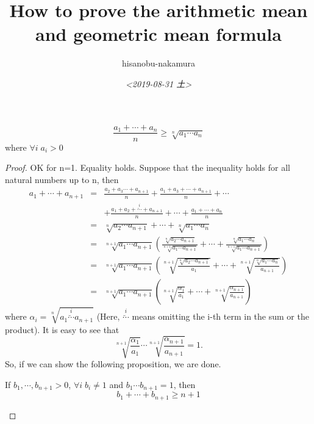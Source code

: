 \documentclass{article}
\author{hisanobu-nakamura}
\date{\textit{<2019-08-31 土>}}
\title{How to prove the arithmetic mean and geometric mean formula}
\begin{document}
\maketitle
\tableofcontents

\begin{equation*}
\label{ }
\frac{a_1 + \cdots + a_n}{n} \ge \sqrt[n]{a_1\cdots a_n}
\end{equation*}
where $\forall i \; a_i > 0$ \\
\begin{proof}
OK for n=1. Equality holds. Suppose that the inequality holds for all natural numbers up to n, then
\begin{eqnarray*}
a_1 + \cdots + a_{n+1} & = & \frac{a_2 + a_3 \cdots + a_{n+1}}{n} + \frac{a_1 + a_3 + \cdots + a_{n+1}}{n} + \cdots  \nonumber \\
 &  &  + \frac{a_1 + a_2 + \overset{i}{\breve{\cdots} } + a_{n+1}}{n} + \cdots + \frac{a_1 + \cdots + a_{n}}{n}\nonumber\\
 & = &  \sqrt[n]{a_2\cdots a_{n+1}} + \cdots + \sqrt[n]{a_1\cdots a_n} \nonumber \\
  & = &  \sqrt[n+1]{a_1\cdots a_{n+1}} \left( \frac{\sqrt[n]{a_2\cdots a_{n+1}}}{\sqrt[n+1]{a_1\cdots a_{n+1}}} + \cdots + \frac{\sqrt[n]{a_1\cdots a_n}}{\sqrt[n+1]{a_1\cdots a_{n+1}}} \right) \nonumber \\
   & = &  \sqrt[n+1]{a_1\cdots a_{n+1}} \left( \sqrt[n+1]{\frac{\sqrt[n]{a_2\cdots a_{n+1}}}{a_1}} + \cdots + \sqrt[n+1]{\frac{\sqrt[n]{a_1\cdots a_{n}}}{a_{n+1}}}\right) \nonumber \\
   & = &  \sqrt[n+1]{a_1\cdots a_{n+1}} \left( \sqrt[n+1]{\frac{\alpha_1}{a_1}} + \cdots + \sqrt[n+1]{\frac{\alpha_{n+1}}{a_{n+1}}}\right) 
\end{eqnarray*}
where $\alpha_i = \sqrt[n]{a_1\overset{i}{\breve{\cdots} } a_{n+1}}$ \; (Here, $\overset{i}{\breve{\cdots} }$ means omitting the i-th term in the sum or the product). It is easy to see that 
\begin{equation*}
\label{ }
\sqrt[n+1]{\frac{\alpha_1}{a_1}}  \cdots  \sqrt[n+1]{\frac{\alpha_{n+1}}{a_{n+1}}} = 1.
\end{equation*}
So, if we can show the following proposition, we are done.
\begin{prop_non}
 If $b_1, \cdots, b_{n+1} >0$, $\forall i \;b_i \ne 1$ and $b_1 \cdots b_{n+1} = 1$, then
\begin{equation}
\label{AM_GM_normalised}
b_1 + \cdots + b_{n+1} \ge n+1
\end{equation}
\end{prop_non}

\end{proof}
\end{document}
